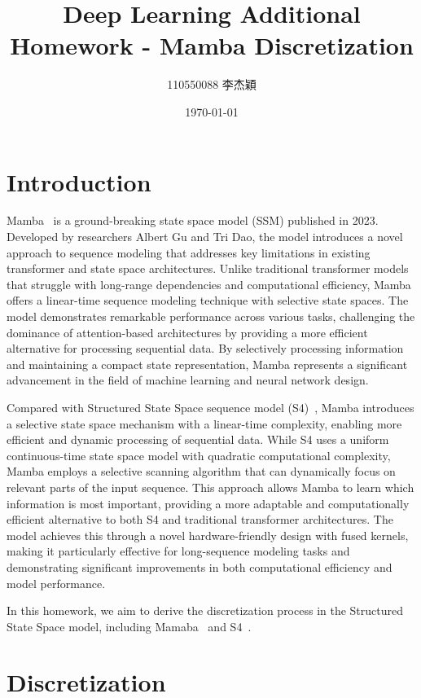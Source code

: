 \documentclass[a4paper]{article}
\title{Deep Learning Additional Homework - Mamba Discretization}
\author{110550088 李杰穎}
\date{\today}
\begin{document}
\maketitle

\section{Introduction}

Mamba~\cite{gu2023mamba} is a ground-breaking state space model (SSM) published in 2023. Developed by researchers Albert Gu and Tri Dao, the model introduces a novel approach to sequence modeling that addresses key limitations in existing transformer and state space architectures. Unlike traditional transformer models that struggle with long-range dependencies and computational efficiency, Mamba offers a linear-time sequence modeling technique with selective state spaces. The model demonstrates remarkable performance across various tasks, challenging the dominance of attention-based architectures by providing a more efficient alternative for processing sequential data. By selectively processing information and maintaining a compact state representation, Mamba represents a significant advancement in the field of machine learning and neural network design.

Compared with Structured State Space sequence model (S4)~\cite{gu2021efficiently}, Mamba introduces a selective state space mechanism with a linear-time complexity, enabling more efficient and dynamic processing of sequential data. While S4 uses a uniform continuous-time state space model with quadratic computational complexity, Mamba employs a selective scanning algorithm that can dynamically focus on relevant parts of the input sequence. This approach allows Mamba to learn which information is most important, providing a more adaptable and computationally efficient alternative to both S4 and traditional transformer architectures. The model achieves this through a novel hardware-friendly design with fused kernels, making it particularly effective for long-sequence modeling tasks and demonstrating significant improvements in both computational efficiency and model performance.

In this homework, we aim to derive the discretization process in the Structured State Space model, including Mamaba~\cite{gu2023mamba} and S4~\cite{gu2021efficiently}.

\section{Discretization}
\end{document}
